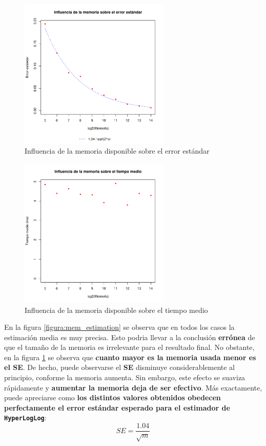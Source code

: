 \begin{figure}[h!]
    \centering
        \includegraphics[width=0.64\textwidth]{../figs/D1/mem_errors_rel.pdf}
        \caption{Influencia de la memoria disponible sobre el error estándar}
    \label{figura:mem_errors}
\end{figure}

\clearpage

\begin{figure}[h!]
    \centering
        \includegraphics[width=0.64\textwidth]{../figs/D1/mem_time_rel.pdf}
        \caption{Influencia de la memoria disponible sobre el tiempo medio}
    \label{figura:mem_time}
\end{figure}

En la figura \ref{figura:mem_estimation} se observa que en todos los casos la estimación media es muy precisa. Esto podria llevar a
la conclusión \textbf{errónea} de que el tamaño de la memoria es irrelevante para el resultado final. No obstante, en la figura
\ref{figura:mem_errors} se observa que \textbf{cuanto mayor es la memoria usada menor es el \textbf{SE}}.
De hecho, puede observarse el \textbf{SE} disminuye considerablemente al principio, conforme la memoria aumenta. Sin embargo,
este efecto se suaviza rápidamente y \textbf{aumentar la memoria deja de ser efectivo}. Más exactamente, puede apreciarse como
\textbf{los distintos valores obtenidos obedecen perfectamente el error estándar esperado para el estimador de
\texttt{HyperLogLog}}:
$$SE = \frac{1.04}{\sqrt{m}}$$

